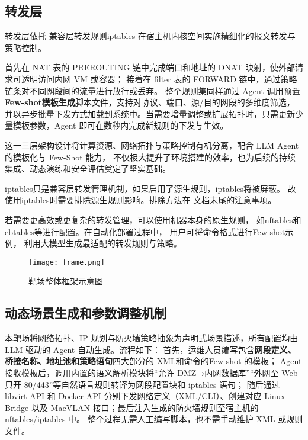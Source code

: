 \documentclass[lang=cn,10pt]{elegantbook}
\begin{document}
\subsection{转发层}
转发层依托 兼容层转发规则iptables 在宿主机内核空间实施精细化的报文转发与策略控制。

首先在 NAT 表的 PREROUTING 链中完成端口和地址的 DNAT 映射，使外部请求可透明访问内网 VM 或容器；
接着在 filter 表的 FORWARD 链中，通过策略链条对不同网段间的流量进行放行或丢弃。
整个规则集同样通过 Agent 调用预置\textbf{Few-shot模板生成}脚本文件，支持对协议、端口、源/目的网段的多维度筛选，
并以异步批量下发方式加载到系统中。当需要增量调整或扩展拓扑时，只需更新少量模板参数，Agent 即可在数秒内完成新规则的下发与生效。

这一三层架构设计将计算资源、网络拓扑与策略控制有机分离，配合 LLM Agent 的模板化与 Few-Shot 能力，
不仅极大提升了环境搭建的效率，也为后续的持续集成、动态演练和安全评估奠定了坚实基础。

\begin{tcolorbox}[colframe=black!30!red, colback=red!5!white, title=注意]

iptables只是兼容层转发管理机制，如果启用了源生规则，iptables将被屏蔽。
故使用iptables时需要排除源生规则影响。排除方法在
\hyperlink{subsec:forward_setting}{文档末尾的注意事项}。

若需要更高效或更复杂的转发管理，可以使用机器本身的原生规则，
如nftables和ebtables等进行配置。在自动化部署过程中，
用户可将命令格式进行Few-shot示例，
利用大模型生成最适配的转发规则与策略。
\end{tcolorbox}

\begin{figure}[H]
\centering
\texttt{[image: frame.png]}  %
\caption{靶场整体框架示意图}  %
\label{fig:frame}  %
\end{figure}

\subsection{动态场景生成和参数调整机制}

本靶场将网络拓扑、IP 规划与防火墙策略抽象为声明式场景描述，所有配置均由 LLM 驱动的 Agent 自动生成。流程如下：  
首先，运维人员编写包含\textbf{网段定义、桥接名称、地址池和策略语句}四大部分的 XML和命令的Few-shot 的模板；  
Agent 接收模板后，调用内置的语义解析模块将“允许 DMZ→内网数据库”“外网至 Web 只开 80/443”等自然语言规则转译为网段配置块和 iptables 语句；  
随后通过 libvirt API 和 Docker API 分别下发网络定义（XML/CLI）、创建对应 Linux Bridge 以及 MacVLAN 接口；最后注入生成的防火墙规则至宿主机的 nftables/iptables 中。  
整个过程无需人工编写脚本，也不需手动维护 XML 或规则文件。
\end{document}
